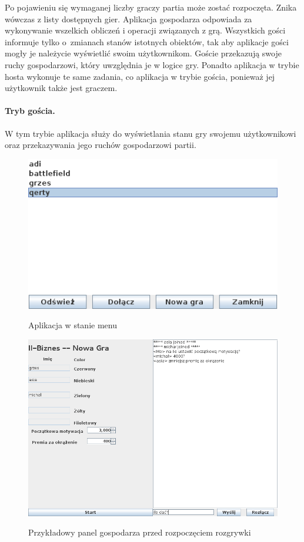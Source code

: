 \documentclass[a4paper, 12pt]{article}
\begin{document}
Po pojawieniu się wymaganej liczby graczy partia może zostać rozpoczęta. Znika wówczas z listy dostępnych gier. Aplikacja gospodarza odpowiada za wykonywanie wszelkich obliczeń i operacji związanych z grą. Wszystkich gości informuje tylko o~zmianach stanów istotnych obiektów, tak aby aplikacje gości mogły je należycie wyświetlić swoim użytkownikom. Goście przekazują swoje ruchy gospodarzowi, który uwzględnia je w logice gry. Ponadto aplikacja w trybie hosta wykonuje te same zadania, co aplikacja w trybie gościa, ponieważ jej użytkownik także jest graczem.

\paragraph{Tryb gościa.} W tym trybie aplikacja służy do wyświetlania stanu gry swojemu użytkownikowi oraz przekazywania jego ruchów gospodarzowi partii.


\begin{figure}
\centering
\caption{Aplikacja w stanie menu}
\includegraphics[scale=0.8]{rysunki/menu.png}
\label{fig:menu}
\end{figure}


\begin{figure}
\centering
\caption{Przykładowy panel gospodarza przed rozpoczęciem rozgrywki}
\includegraphics[scale=0.8]{rysunki/inicjacja.png}
\label{fig:inicjacja}
\end{figure}
\vspace{2cm}
\end{document}
